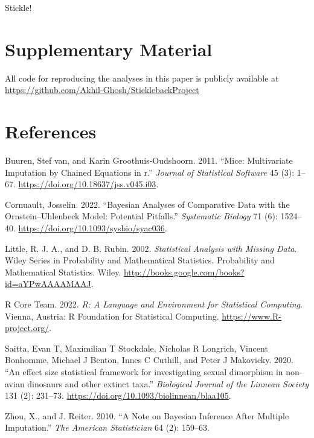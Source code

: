 \documentclass[
  12pt,
]{article}
\newlength{\cslhangindent}
\newlength{\cslentryspacingunit} %
\newenvironment{CSLReferences}[2] %
 {%
  \setlength{\parindent}{0pt}
  \ifodd #1
  \let\oldpar\par
  \def\par{\hangindent=\cslhangindent\oldpar}
  \fi
  \setlength{\parskip}{#2\cslentryspacingunit}
 }%
 {}
\begin{document}
Stickle!

\hypertarget{supplementary-material}{%
\section*{Supplementary Material}\label{supplementary-material}}

All code for reproducing the analyses in this paper is publicly
available at \url{https://github.com/Akhil-Ghosh/SticklebackProject}

\hypertarget{references}{%
\section*{References}\label{references}}

\hypertarget{refs}{}
\begin{CSLReferences}{1}{0}
\leavevmode{}%
Buuren, Stef van, and Karin Groothuis-Oudshoorn. 2011. {``Mice:
Multivariate Imputation by Chained Equations in r.''} \emph{Journal of
Statistical Software} 45 (3): 1--67.
\url{https://doi.org/10.18637/jss.v045.i03}.

\leavevmode{}%
Cornuault, Josselin. 2022. {``{Bayesian Analyses of Comparative Data
with the Ornstein--Uhlenbeck Model: Potential Pitfalls}.''}
\emph{Systematic Biology} 71 (6): 1524--40.
\url{https://doi.org/10.1093/sysbio/syac036}.

\leavevmode{}%
Little, R. J. A., and D. B. Rubin. 2002. \emph{Statistical Analysis with
Missing Data}. Wiley Series in Probability and Mathematical Statistics.
Probability and Mathematical Statistics. Wiley.
\url{http://books.google.com/books?id=aYPwAAAAMAAJ}.

\leavevmode{}%
R Core Team. 2022. \emph{R: A Language and Environment for Statistical
Computing}. Vienna, Austria: R Foundation for Statistical Computing.
\url{https://www.R-project.org/}.

\leavevmode{}%
Saitta, Evan T, Maximilian T Stockdale, Nicholas R Longrich, Vincent
Bonhomme, Michael J Benton, Innes C Cuthill, and Peter J Makovicky.
2020. {``{An effect size statistical framework for investigating sexual
dimorphism in non-avian dinosaurs and other extinct taxa}.''}
\emph{Biological Journal of the Linnean Society} 131 (2): 231--73.
\url{https://doi.org/10.1093/biolinnean/blaa105}.

\leavevmode{}%
Zhou, X., and J. Reiter. 2010. {``A Note on Bayesian Inference After
Multiple Imputation.''} \emph{The American Statistician} 64 (2):
159--63.

\end{CSLReferences}
\end{document}
